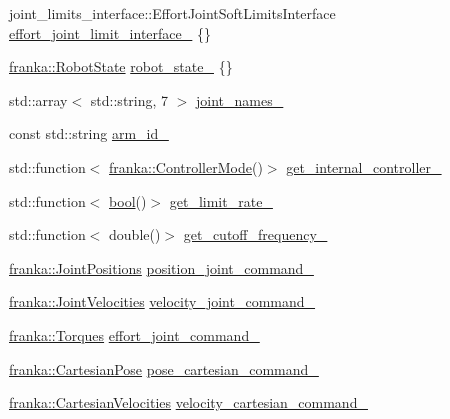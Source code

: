 \begin{DoxyCompactItemize}
\item 
joint\+\_\+limits\+\_\+interface\+::\+Effort\+Joint\+Soft\+Limits\+Interface \hyperlink{classfranka__hw_1_1FrankaHW_a3545598adde92a2cd78af121bf40f24b}{effort\+\_\+joint\+\_\+limit\+\_\+interface\+\_\+} \{\}
\item 
\hyperlink{structfranka_1_1RobotState}{franka\+::\+Robot\+State} \hyperlink{classfranka__hw_1_1FrankaHW_a1b9c3149cda8b7d78d52ecea65a8ebab}{robot\+\_\+state\+\_\+} \{\}
\item 
std\+::array$<$ std\+::string, 7 $>$ \hyperlink{classfranka__hw_1_1FrankaHW_a209e8f3424efe0fd05725be609d7205a}{joint\+\_\+names\+\_\+}
\item 
const std\+::string \hyperlink{classfranka__hw_1_1FrankaHW_acb16f326973e2eb1c33c28f71492d7d5}{arm\+\_\+id\+\_\+}
\item 
std\+::function$<$ \hyperlink{namespacefranka_a3e20bc77587e2c0c53598753e3f4816b}{franka\+::\+Controller\+Mode}()$>$ \hyperlink{classfranka__hw_1_1FrankaHW_a0e2aab0e386f9ed57345cd56f02643ac}{get\+\_\+internal\+\_\+controller\+\_\+}
\item 
std\+::function$<$ \hyperlink{classbool}{bool}()$>$ \hyperlink{classfranka__hw_1_1FrankaHW_a0d26d3a30e63e83e19cad138a9811fc7}{get\+\_\+limit\+\_\+rate\+\_\+}
\item 
std\+::function$<$ double()$>$ \hyperlink{classfranka__hw_1_1FrankaHW_ada3ea355cd85b06247ee9def60485240}{get\+\_\+cutoff\+\_\+frequency\+\_\+}
\item 
\hyperlink{classfranka_1_1JointPositions}{franka\+::\+Joint\+Positions} \hyperlink{classfranka__hw_1_1FrankaHW_a21bc8c749210aa50ac5a847065d01042}{position\+\_\+joint\+\_\+command\+\_\+}
\item 
\hyperlink{classfranka_1_1JointVelocities}{franka\+::\+Joint\+Velocities} \hyperlink{classfranka__hw_1_1FrankaHW_ae25ff898759d1f0c9a34c873cadd8e01}{velocity\+\_\+joint\+\_\+command\+\_\+}
\item 
\hyperlink{classfranka_1_1Torques}{franka\+::\+Torques} \hyperlink{classfranka__hw_1_1FrankaHW_a718469d0646cacde1bd8ad1b798a528c}{effort\+\_\+joint\+\_\+command\+\_\+}
\item 
\hyperlink{classfranka_1_1CartesianPose}{franka\+::\+Cartesian\+Pose} \hyperlink{classfranka__hw_1_1FrankaHW_a28885bdd6202f0efbe793725e5d2497b}{pose\+\_\+cartesian\+\_\+command\+\_\+}
\item 
\hyperlink{classfranka_1_1CartesianVelocities}{franka\+::\+Cartesian\+Velocities} \hyperlink{classfranka__hw_1_1FrankaHW_aaa601f471de0a83874ba1f9de038eb30}{velocity\+\_\+cartesian\+\_\+command\+\_\+}

\end{DoxyCompactItemize}
